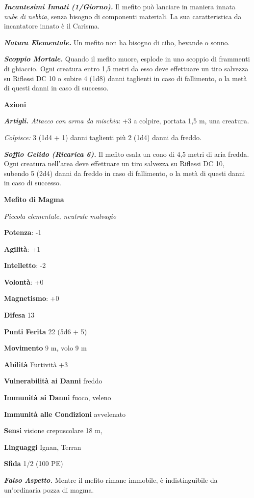 \begin{multicols}{2}
\emph{\textbf{Incantesimi Innati (1/Giorno).}} Il mefito può lanciare in
maniera innata \emph{nube di nebbia}, senza bisogno di componenti
materiali. La sua caratteristica da incantatore innato è il Carisma.

\emph{\textbf{Natura Elementale.}} Un mefito non ha bisogno di cibo,
bevande o sonno.

\emph{\textbf{Scoppio Mortale.}} Quando il mefito muore, esplode in uno
scoppio di frammenti di ghiaccio. Ogni creatura entro 1,5 metri da esso
deve effettuare un tiro salvezza su Riflessi DC 10 o subire 4 (1d8)
danni taglienti in caso di fallimento, o la metà di questi danni in caso
di successo.

\textbf{Azioni}

\emph{\textbf{Artigli.} Attacco con arma da mischia}: +3 a colpire,
portata 1,5 m, una creatura.

\emph{Colpisce:} 3 (1d4 + 1) danni taglienti più 2 (1d4) danni da
freddo.

\emph{\textbf{Soffio Gelido (Ricarica 6).}} Il mefito esala un cono di
4,5 metri di aria fredda. Ogni creatura nell'area deve effettuare un
tiro salvezza su Riflessi DC 10, subendo 5 (2d4) danni da freddo in
caso di fallimento, o la metà di questi danni in caso di successo.

\textbf{Mefito di Magma}

\emph{Piccola elementale, neutrale malvagio}

\textbf{Potenza}: -1

\textbf{Agilità}: +1

\textbf{Intelletto}: -2

\textbf{Volontà}: +0

\textbf{Magnetismo}: +0

\textbf{Difesa} 13

\textbf{Punti Ferita} 22 (5d6 + 5)

\textbf{Movimento} 9 m, volo 9 m

\textbf{Abilità} Furtività +3

\textbf{Vulnerabilità ai Danni} freddo

\textbf{Immunità ai Danni} fuoco, veleno

\textbf{Immunità alle Condizioni} avvelenato

\textbf{Sensi} visione crepuscolare 18 m, 

\textbf{Linguaggi} Ignan, Terran

\textbf{Sfida} 1/2 (100 PE)

\emph{\textbf{Falso Aspetto.}} Mentre il mefito rimane immobile, è
indistinguibile da un'ordinaria pozza di magma.


\end{multicols}
